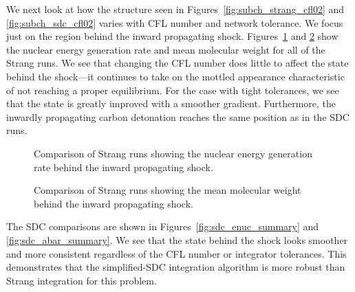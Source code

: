 \documentclass[linenumbers]{aastex631}
\newcommand{\isotm}[2]{{}^{#2}\mathrm{#1}}
\begin{document}


We next look at how the structure seen in
Figures~\ref{fig:subch_strang_cfl02} and \ref{fig:subch_sdc_cfl02}
varies with CFL number and network tolerance.  We focus just on the
region behind the inward propagating shock.
Figures~\ref{fig:strang_enuc_summary} and
\ref{fig:strang_abar_summary} show the nuclear energy generation rate
and mean molecular weight for all of the Strang runs.  We see that
changing the CFL number does little to affect the state behind the
shock---it continues to take on the mottled appearance characteristic
of not reaching a proper equilibrium.  For the case with tight tolerances, we
see that the state is greatly improved with a smoother gradient.  Furthermore, the inwardly
propagating carbon detonation reaches the same position as in the SDC runs.

\begin{figure}
\caption{\label{fig:strang_enuc_summary} Comparison of Strang runs showing
the nuclear energy generation rate behind the inward propagating
shock.}
\end{figure}

\begin{figure}
\caption{\label{fig:strang_abar_summary} Comparison of Strang runs showing
the mean molecular weight behind the inward propagating
shock.}
\end{figure}

The SDC comparisons are shown in Figures~\ref{fig:sdc_enuc_summary}
and \ref{fig:sdc_abar_summary}.  We see that the state behind the
shock looks smoother and more consistent regardless of the CFL number or integrator tolerances.
This demonstrates that the simplified-SDC integration algorithm is more
robust than Strang integration for this problem.
\end{document}
